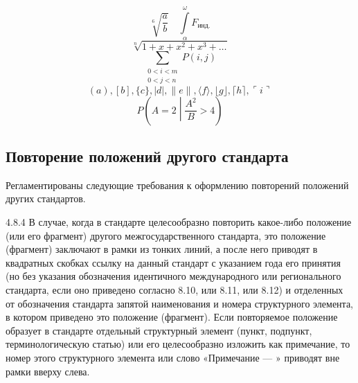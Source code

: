 \documentclass[12pt, twoside, final]{ruost}
\begin{document}
\begin{OST}
\begin{equation}
					\end{equation}
					\begin{equation}
					\sqrt[6]{\frac{a}{b}} \quad \int\limits_{\alpha}^{\omega} F_\text{инд.}
					\end{equation}
					\begin{equation}
					\sqrt[n]{1+x+x^2+x^3+\ldots}
					\end{equation}
					\begin{equation}
					\sum_{\substack{
							0<i<m \\
							0<j<n
						}}
						P(i,j)
					\end{equation}
					\begin{equation}
					( a ), [ b ], \{ c \}, | d |, \| e \|,
					\langle f \rangle, \lfloor g \rfloor,
					\lceil h \rceil, \ulcorner i \urcorner
					\end{equation}
					\begin{equation}
					P\left(A=2\middle|\frac{A^2}{B}>4\right)
					\end{equation}
					
					
			\subsection{Повторение положений другого стандарта}
			
				\point Регламентированы следующие требования к оформлению повторений положений других стандартов.
				
				\begin{stdquote}
					\par 4.8.4 В случае, когда в стандарте целесообразно повторить какое-либо положение (или его фрагмент) другого межгосударственного стандарта, это положение (фрагмент) заключают в рамки из тонких линий, а после него приводят в квадратных скобках ссылку на данный стандарт с указанием года его принятия (но без указания обозначения идентичного международного или регионального стандарта, если оно приведено согласно 8.10, или 8.11, или 8.12) и отделенных от обозначения стандарта запятой наименования и номера структурного элемента, в котором приведено это положение (фрагмент). Если повторяемое положение образует в стандарте отдельный структурный элемент (пункт, подпункт, терминологическую статью) или его целесообразно изложить как примечание, то номер этого структурного элемента или слово «Примечание --- » приводят вне рамки вверху слева.
					\par [ГОСТ 1.5---2001]
				\end{stdquote}
				

\end{OST}
\end{document}
